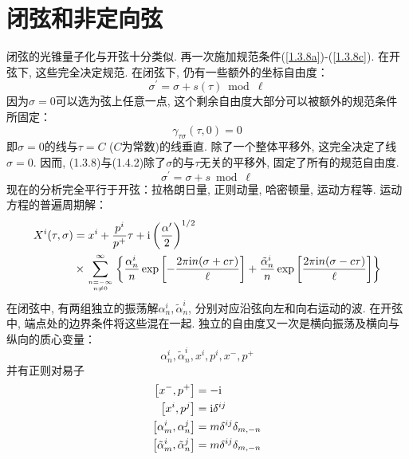 \section{\texorpdfstring{闭弦和非定向弦}{1.4 Closed and unoriented strings}} \label{sec:1.4}
闭弦的光锥量子化与开弦十分类似. 再一次施加规范条件(\ref{1.3.8a})-(\ref{1.3.8c}). 在开弦下, 这些完全决定规范. 在闭弦下, 仍有一些额外的坐标自由度：
\begin{equation}
\sigma^{\prime}=\sigma+s(\tau) \bmod \ell
\end{equation}
因为$\sigma=0$可以选为弦上任意一点, 这个剩余自由度大部分可以被额外的规范条件所固定：
\begin{equation}
\gamma_{\tau \sigma}(\tau, 0)=0
\end{equation}
即$\sigma=0$的线与$\tau=C$ ($C$为常数)的线垂直. 除了一个整体平移外, 这完全决定了线$\sigma=0$. 因而, (1.3.8)与(1.4.2)除了$\sigma$的与$\tau$无关的平移外, 固定了所有的规范自由度. 
\begin{equation}
\sigma^{\prime}=\sigma+s \bmod \ell   \label{sigma-translation}
\end{equation}
现在的分析完全平行于开弦：拉格朗日量, 正则动量, 哈密顿量, 运动方程等. 运动方程的普遍周期解：
\begin{equation}
\begin{aligned}
X^{i}(\tau, \sigma) &=x^{i}+\frac{p^{i}}{p^{+}} \tau+\mathrm{i}\left(\frac{\alpha^{\prime}}{2}\right)^{1 / 2} \\
& \times \sum_{n=-\infty \atop n \neq 0}^{\infty}\left\{\frac{\alpha_{n}^{i}}{n} \exp \left[-\frac{2 \pi \mathrm{i} n(\sigma+c \tau)}{\ell}\right]+\frac{\tilde{\alpha}_{n}^{i}}{n} \exp \left[\frac{2 \pi \mathrm{i} n(\sigma-c \tau)}{\ell}\right]\right\} \label{general-periodic-solution}
\end{aligned}
\end{equation}
在闭弦中, 有两组独立的振荡解$\alpha_{n}^{i}, \tilde{\alpha}_{n}^{i}$, 分别对应沿弦向左和向右运动的波. 在开弦中, 端点处的边界条件将这些混在一起. 独立的自由度又一次是横向振荡及横向与纵向的质心变量：
\begin{equation}
\alpha_{n}^{i}, \tilde{\alpha}_{n}^{i}, x^{i}, p^{i}, x^{-}, p^{+}
\end{equation}
并有正则对易子
\begin{subequations}
\begin{align}
\left[x^{-}, p^{+}\right]&=-\mathrm{i} \\
\left[x^{i}, p^{j}\right]&=\mathrm{i} \delta^{i j} \\
\left[\alpha_{m}^{i}, \alpha_{n}^{j}\right]&=m \delta^{i j} \delta_{m,-n} \\
\left[\tilde{\alpha}_{m}^{i}, \tilde{\alpha}_{n}^{j}\right]&=m \delta^{i j} \delta_{m,-n} 
\end{align}
\end{subequations}
